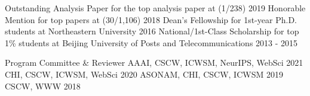 \documentclass[letterpaper]{awesome-cv}
\begin{document}
\addvspace{2ex}
\begin{cventries}
  \cvaward
    {Outstanding Analysis Paper}
    {for the top analysis paper at  (1/238)}
    {2019}
  \cvaward
    {Honorable Mention}
    {for top papers at  (30/1,106)}
    {2018}
  \cvaward
    {Dean's Fellowship}
    {for 1st-year Ph.D. students at Northeastern University}
    {2016}
  \cvaward
    {National/1st-Class Scholarship}
    {for top 1\% students at Beijing University of Posts and Telecommunications}
    {2013 - 2015}
\end{cventries}

\addvspace{2ex}
\begin{cventries}
  \cvaward
    {Program Committee \& Reviewer}
    {AAAI, CSCW, ICWSM, NeurIPS, WebSci}
    {2021}
  \cvaward
    {}
    {CHI, CSCW, ICWSM, WebSci}
    {2020}
  \cvaward
    {}
    {ASONAM, CHI, CSCW, ICWSM}
    {2019}
  \cvaward
    {}
    {CSCW, WWW}
    {2018}
\end{cventries}
\end{document}
